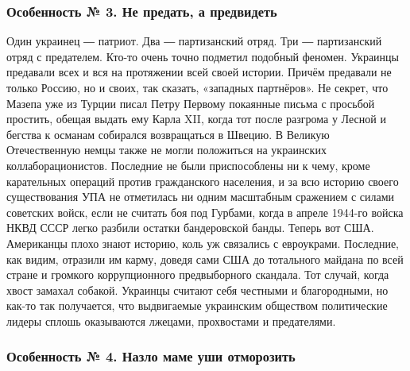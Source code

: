\subsubsection{Особенность № 3. Не предать, а предвидеть}

Один украинец ― патриот. Два ― партизанский отряд. Три ― партизанский отряд с
предателем. Кто-то очень точно подметил подобный феномен. Украинцы предавали
всех и вся на протяжении всей своей истории. Причём предавали не только Россию,
но и своих, так сказать, «западных партнёров». Не секрет, что Мазепа уже из
Турции писал Петру Первому покаянные письма с просьбой простить, обещая выдать
ему Карла XII, когда тот после разгрома у Лесной и бегства к османам собирался
возвращаться в Швецию. В Великую Отечественную немцы также не могли положиться
на украинских коллаборационистов. Последние не были приспособлены ни к чему,
кроме карательных операций против гражданского населения, и за всю историю
своего существования УПА не отметилась ни одним масштабным сражением с силами
советских войск, если не считать боя под Гурбами, когда в апреле 1944-го войска
НКВД СССР легко разбили остатки бандеровской банды. Теперь вот США. Американцы
плохо знают историю, коль уж связались с евроукрами. Последние, как видим,
отразили им карму, доведя сами США до тотального майдана по всей стране и
громкого коррупционного предвыборного скандала. Тот случай, когда хвост замахал
собакой. Украинцы считают себя честными и благородными, но как-то так
получается, что выдвигаемые украинским обществом политические лидеры сплошь
оказываются лжецами, прохвостами и предателями.

\subsubsection{Особенность № 4. Назло маме уши отморозить}

